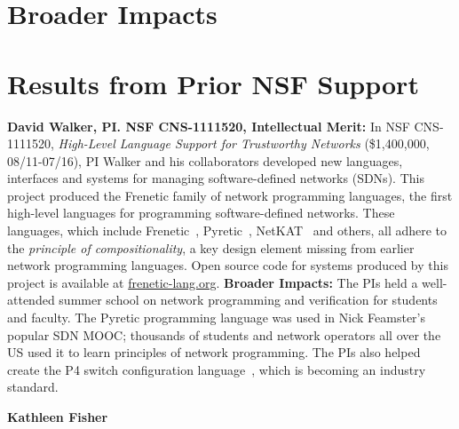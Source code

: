 \section{Broader Impacts}
\label{sec:impact}


\section{Results from Prior NSF Support}
\label{sec:prior-support}

\noindent
{\bf David Walker, PI. NSF CNS-1111520, Intellectual Merit:}
In NSF CNS-1111520, \emph{High-Level Language Support for Trustworthy Networks}
(\$1,400,000, 08/11-07/16),
PI Walker and his collaborators developed new languages, interfaces
and systems for managing software-defined networks (SDNs).  
This project produced the Frenetic family
of network programming languages, the first high-level languages for
programming software-defined networks.  These languages, which include
Frenetic~\cite{frenetic}, 
Pyretic~\cite{pyretic},
NetKAT~\cite{netkat} and others, all adhere to the
\emph{principle of compositionality}, a key design element missing
from earlier network programming languages.  
Open source code for systems produced by this project is available
at \url{frenetic-lang.org}.
%
{\bf Broader Impacts:} 
The PIs held a well-attended summer school on network programming and 
verification for students and faculty. The
Pyretic programming language was used in Nick Feamster's popular
SDN MOOC; thousands of students and
network operators all over the US used it to learn principles of network
programming.  The PIs
also helped create the P4 switch configuration language~\cite{P4}, which is
becoming an industry standard.

\medskip
\noindent
{\bf Kathleen Fisher} 

